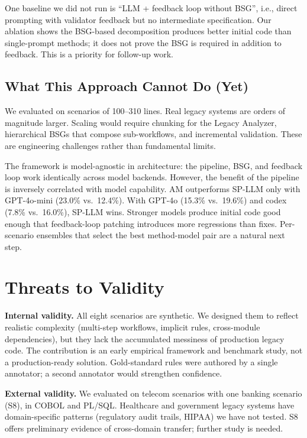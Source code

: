 \documentclass[conference]{IEEEtran}
\begin{document}
One baseline we did not run is ``LLM + feedback loop without BSG'', i.e., direct prompting with validator feedback but no intermediate specification. Our ablation shows the BSG-based decomposition produces better initial code than single-prompt methods; it does not prove the BSG is required in addition to feedback. This is a priority for follow-up work.

\subsection{What This Approach Cannot Do (Yet)}

We evaluated on scenarios of 100--310 lines. Real legacy systems are orders of magnitude larger. Scaling would require chunking for the Legacy Analyzer, hierarchical BSGs that compose sub-workflows, and incremental validation. These are engineering challenges rather than fundamental limits.

The framework is model-agnostic in architecture: the pipeline, BSG, and feedback loop work identically across model backends. However, the benefit of the pipeline is inversely correlated with model capability. AM outperforms SP-LLM only with GPT-4o-mini (23.0\% vs.\ 12.4\%). With GPT-4o (15.3\% vs.\ 19.6\%) and codex (7.8\% vs.\ 16.0\%), SP-LLM wins. Stronger models produce initial code good enough that feedback-loop patching introduces more regressions than fixes. Per-scenario ensembles that select the best method-model pair are a natural next step.

\section{Threats to Validity}
\label{sec:threats}

\textbf{Internal validity.} All eight scenarios are synthetic. We designed them to reflect realistic complexity (multi-step workflows, implicit rules, cross-module dependencies), but they lack the accumulated messiness of production legacy code. The contribution is an early empirical framework and benchmark study, not a production-ready solution. Gold-standard rules were authored by a single annotator; a second annotator would strengthen confidence.

\textbf{External validity.} We evaluated on telecom scenarios with one banking scenario (S8), in COBOL and PL/SQL. Healthcare and government legacy systems have domain-specific patterns (regulatory audit trails, HIPAA) we have not tested. S8 offers preliminary evidence of cross-domain transfer; further study is needed.
\end{document}
